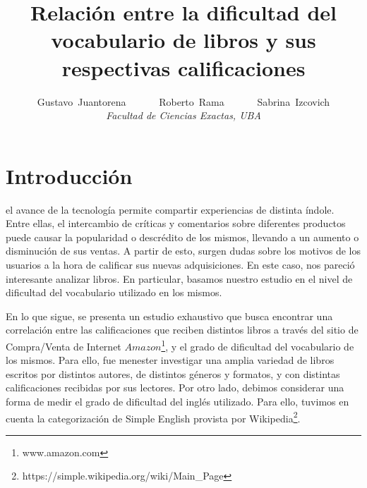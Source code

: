 \documentclass[12pt,journal,compsoc]{IEEEtran}
\begin{document}
\title{Relación entre la dificultad del vocabulario de libros y sus respectivas calificaciones}

\author{Gustavo~Juantorena~~~~~~
        Roberto~Rama~~~~~~
        Sabrina~Izcovich\\
        \textit{Facultad de Ciencias Exactas, UBA}}



\maketitle
\IEEEdisplaynontitleabstractindextext
\IEEEpeerreviewmaketitle

\section{Introducción}
 el avance de la tecnología permite compartir experiencias de distinta índole. Entre ellas, el intercambio de críticas y comentarios sobre diferentes productos puede causar la popularidad o descrédito de los mismos, llevando a un aumento o disminución de sus ventas. A partir de esto, surgen dudas sobre los motivos de los usuarios a la hora de calificar sus nuevas adquisiciones. En este caso, nos pareció interesante analizar libros. En particular, basamos nuestro estudio en el nivel de dificultad del vocabulario utilizado en los mismos. 

En lo que sigue, se presenta un estudio exhaustivo que busca encontrar una correlación entre las calificaciones que reciben distintos libros a través del sitio de Compra/Venta de Internet $Amazon$\footnote{www.amazon.com}, y el grado de dificultad del vocabulario de los mismos. Para ello, fue menester investigar una amplia variedad de libros escritos por distintos autores, de distintos géneros y formatos, y con distintas calificaciones recibidas por sus lectores. Por otro lado, debimos considerar una forma de medir el grado de dificultad del inglés utilizado. Para ello, tuvimos en cuenta la categorización de Simple English provista por Wikipedia\footnote{https://simple.wikipedia.org/wiki/Main\_Page}.
\end{document}
